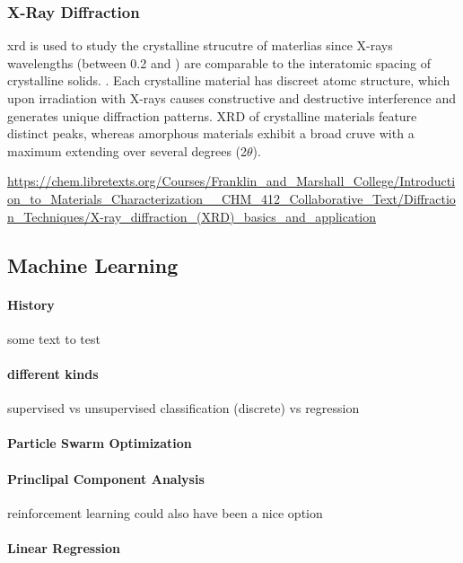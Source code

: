 \subsubsection{X-Ray Diffraction}
\gls{xrd} is used to study the crystalline strucutre of materlias since X-rays wavelengths (between 0.2 and ) are comparable to the interatomic spacing of crystalline solids.  \cite{Kaliva2020}.
Each crystalline material has discreet atomc structure, which upon irradiation with X-rays causes constructive and destructive interference and generates unique diffraction patterns. 
XRD  of crystalline materials feature distinct peaks, whereas amorphous materials exhibit a broad cruve with a maximum extending over several degrees (2$\theta$).

\url{https://chem.libretexts.org/Courses/Franklin_and_Marshall_College/Introduction_to_Materials_Characterization__CHM_412_Collaborative_Text/Diffraction_Techniques/X-ray_diffraction_(XRD)_basics_and_application}\\


\subsection{Machine Learning}
\paragraph{History}
some text to test
\paragraph{different kinds} 
supervised vs unsupervised
classification (discrete) vs regression
\paragraph{Particle Swarm Optimization}
\paragraph{Princlipal Component Analysis}
reinforcement learning could also have been a nice option
\paragraph{Linear Regression}
